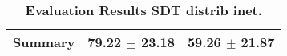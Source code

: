 \begin{table}[htb]
{\begin{tabular}{lll}
\midrule
\textbf{Summary                                  } &                  \phantom{0}79.22 $\pm$ 23.18 &                       \phantom{0}59.26 $\pm$ 21.87 \\
\bottomrule
\end{tabular}%
}
\caption{\textbf{Evaluation Results SDT distrib inet.}}
\label{tab:eval-results}
\end{table}
